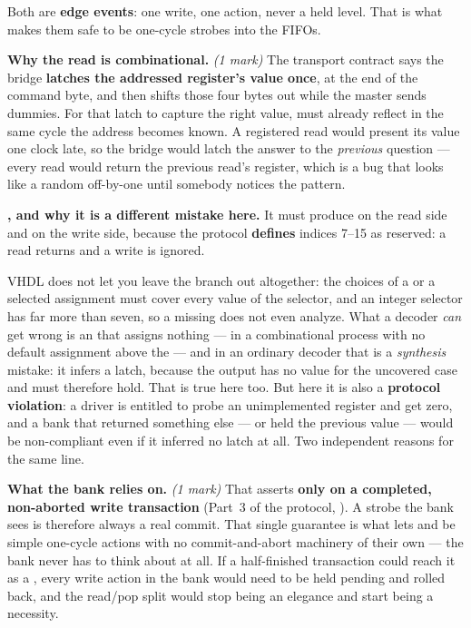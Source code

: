 Both are \textbf{edge events}: one write, one action, never a held level. That is what makes them
safe to be one-cycle strobes into the FIFOs.

\textbf{Why the read is combinational.} \textit{(1 mark)} The transport contract says the bridge
\textbf{latches the addressed register's value once}, at the end of the command byte, and then
shifts those four bytes out while the master sends dummies. For that latch to capture the right
value,  must already reflect  in the same cycle the address becomes
known. A registered read would present its value one clock late, so the bridge would latch the answer
to the \emph{previous} question --- every read would return the previous read's register, which is a
bug that looks like a random off-by-one until somebody notices the pattern.

\textbf{, and why it is a different mistake here.} It must produce
 on the read side and  on the write side, because the protocol
\textbf{defines} indices 7--15 as reserved: a read returns  and a write is ignored.

VHDL does not let you leave the branch out altogether: the choices of a  or a selected
assignment must cover every value of the selector, and an integer selector has far more than seven,
so a missing  does not even analyze. What a decoder \emph{can} get wrong is an
 that assigns nothing ---  in a combinational process with no
default assignment above the  --- and in an ordinary decoder that is a \emph{synthesis}
mistake: it infers a latch, because the output has no value for the uncovered case and must therefore
hold. That is true here too. But here it is also a \textbf{protocol violation}: a driver is entitled
to probe an unimplemented register and get zero, and a bank that returned something else --- or
held the previous value --- would be non-compliant even if it inferred no latch at all. Two
independent reasons for the same line.

\textbf{What the bank relies on.} \textit{(1 mark)} That  asserts
 \textbf{only on a completed, non-aborted write transaction} (Part~3 of the protocol,
). A strobe the bank sees is therefore always a real commit. That single
guarantee is what lets  and  be simple one-cycle actions with no
commit-and-abort machinery of their own --- the bank never has to think about  at all. If a
half-finished transaction could reach it as a , every write action in the bank would
need to be held pending and rolled back, and the read/pop split would stop being an elegance and
start being a necessity.


